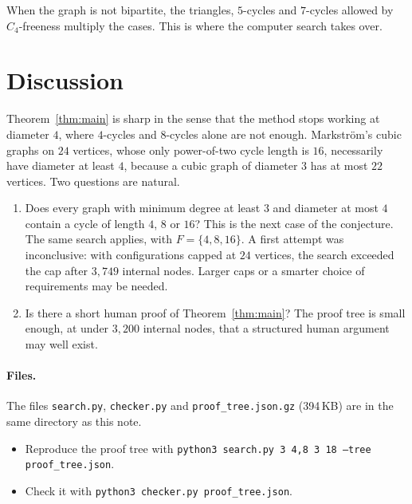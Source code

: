 \documentclass[11pt]{article}
\theoremstyle{remark}
\begin{document}
When the graph is not bipartite, the triangles, $5$-cycles and $7$-cycles allowed by
$C_4$-freeness multiply the cases. This is where the computer search takes over.

\section{Discussion}

Theorem~\ref{thm:main} is sharp in the sense that the method stops working at diameter $4$, where
$4$-cycles and $8$-cycles alone are not enough. Markstr\"om's cubic graphs on $24$ vertices, whose
only power-of-two cycle length is $16$, necessarily have diameter at least $4$, because a cubic graph
of diameter $3$ has at most $22$ vertices. Two questions are natural.

\begin{enumerate}
\item Does every graph with minimum degree at least $3$ and diameter at most $4$ contain a cycle of
  length $4$, $8$ or $16$? This is the next case of the conjecture. The same search applies, with
  $F=\{4,8,16\}$. A first attempt was inconclusive: with configurations capped at $24$
  vertices, the search exceeded the cap after $3{,}749$ internal nodes. Larger caps or a smarter
  choice of requirements may be needed.
\item Is there a short human proof of Theorem~\ref{thm:main}? The proof tree is small enough, at
  under $3{,}200$ internal nodes, that a structured human argument may well exist.
\end{enumerate}

\paragraph{Files.} The files \texttt{search.py}, \texttt{checker.py} and
\texttt{proof\_tree.json.gz} (394\,KB) are in the same directory as this note.
\begin{itemize}
\item Reproduce the proof tree with \texttt{python3 search.py 3 4,8 3 18 --tree proof\_tree.json}.
\item Check it with \texttt{python3 checker.py proof\_tree.json}.
\end{itemize}
\end{document}
